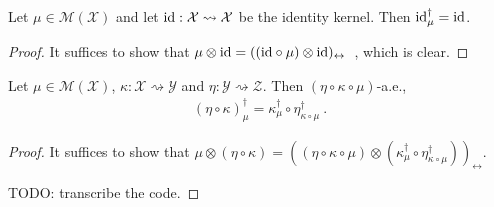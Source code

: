 \begin{lemma}
  \label{lem:bayesInv_id}
  Let $\mu \in \mathcal M (\mathcal X)$ and let $\textup{id} : \mathcal X \rightsquigarrow \mathcal X$ be the identity kernel. Then $\textup{id}_\mu^\dagger = \textup{id}$.
\end{lemma}

\begin{proof}%
\uses{}
It suffices to show that $\mu \otimes \textup{id} = ((\textup{id} \circ \mu) \otimes \textup{id})_\leftrightarrow$~, which is clear.
\end{proof}

\begin{lemma}
  \label{lem:bayesInv_comp}
  Let $\mu \in \mathcal M(\mathcal X)$, $\kappa : \mathcal X \rightsquigarrow \mathcal Y$ and $\eta : \mathcal Y \rightsquigarrow \mathcal Z$. Then $(\eta \circ \kappa \circ \mu)$-a.e.,
  \begin{align*}
  (\eta \circ \kappa)_\mu^\dagger = \kappa_{\mu}^\dagger \circ \eta_{\kappa \circ \mu}^\dagger
  \: .
  \end{align*}
\end{lemma}

\begin{proof}%
\uses{}
It suffices to show that $\mu \otimes (\eta \circ \kappa) = ((\eta \circ \kappa \circ \mu) \otimes (\kappa_{\mu}^\dagger \circ \eta_{\kappa \circ \mu}^\dagger))_\leftrightarrow$.

TODO: transcribe the code.
\end{proof}